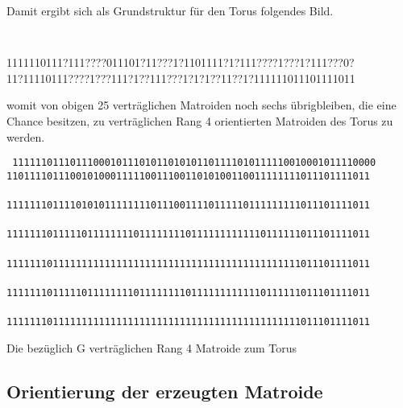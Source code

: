 Damit ergibt sich als Grundstruktur für den Torus folgendes Bild.

{\small\tt
\begin{center}
1111110111?111????011101?11???1?1101111?1?111????1???1?111???0?\\
11?11110111????1???111?1??111???1?1?1??11??1?111111011101111011\\
\end{center}
}

womit von obigen 25 verträglichen Matroiden noch sechs übrigbleiben, die eine
Chance besitzen, zu verträglichen Rang 4 orientierten Matroiden des Torus
zu werden.

\begin{table}[htb]
\begin{center}
{\scriptsize\tt
{}
111111011101110001011101011010101101111010111110010001011110000\\
110111101110010100011111001110011010100110011111111011101111011\\
\\
111111101111010101111111101110011110111110111111111011101111011\\
\\
111111101111101111111101111111101111111111110111111011101111011\\
\\
111111101111111111111111111111111111111111111111111011101111011\\
\\
111111101111101111111101111111101111111111110111111011101111011\\
\\
111111101111111111111111111111111111111111111111111011101111011\\
\etab
}
\end{center}
\caption{Die bezüglich G verträglichen Rang 4 Matroide zum Torus}
\label{torus4mat}
\end{table}

\clearpage
\subsection{Orientierung der erzeugten Matroide}

